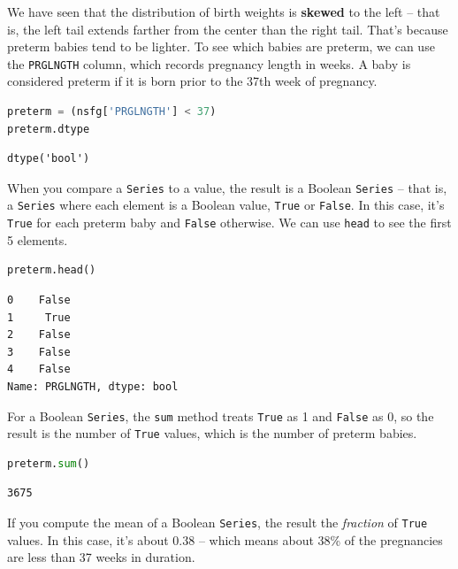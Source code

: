 \documentclass[
]{book}
\newcommand{\passthrough}[1]{#1}
\begin{document}
We have seen that the distribution of birth weights is \textbf{skewed}
to the left -- that is, the left tail extends farther from the center
than the right tail. That's because preterm babies tend to be lighter.
To see which babies are preterm, we can use the
\passthrough{\lstinline!PRGLNGTH!} column, which records pregnancy
length in weeks. A baby is considered preterm if it is born prior to the
37th week of pregnancy.

\begin{lstlisting}[language=Python]
preterm = (nsfg['PRGLNGTH'] < 37)
preterm.dtype
\end{lstlisting}

\begin{lstlisting}
dtype('bool')
\end{lstlisting}

When you compare a \passthrough{\lstinline!Series!} to a value, the
result is a Boolean \passthrough{\lstinline!Series!} -- that is, a
\passthrough{\lstinline!Series!} where each element is a Boolean value,
\passthrough{\lstinline!True!} or \passthrough{\lstinline!False!}. In
this case, it's \passthrough{\lstinline!True!} for each preterm baby and
\passthrough{\lstinline!False!} otherwise. We can use
\passthrough{\lstinline!head!} to see the first 5 elements.

\begin{lstlisting}[language=Python]
preterm.head()
\end{lstlisting}

\begin{lstlisting}
0    False
1     True
2    False
3    False
4    False
Name: PRGLNGTH, dtype: bool
\end{lstlisting}

For a Boolean \passthrough{\lstinline!Series!}, the
\passthrough{\lstinline!sum!} method treats
\passthrough{\lstinline!True!} as 1 and \passthrough{\lstinline!False!}
as 0, so the result is the number of \passthrough{\lstinline!True!}
values, which is the number of preterm babies.

\begin{lstlisting}[language=Python]
preterm.sum()
\end{lstlisting}

\begin{lstlisting}
3675
\end{lstlisting}

If you compute the mean of a Boolean \passthrough{\lstinline!Series!},
the result the \emph{fraction} of \passthrough{\lstinline!True!} values.
In this case, it's about 0.38 -- which means about 38\% of the
pregnancies are less than 37 weeks in duration.
\end{document}
